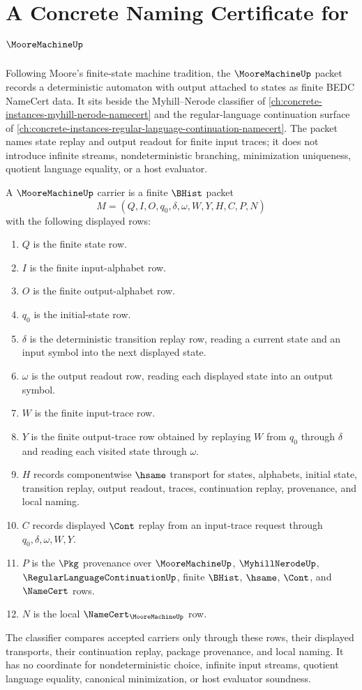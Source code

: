 \chapter{A Concrete Naming Certificate for $\MooreMachineUp$}
\label{ch:concrete-instances-moore-machine-namecert}

Following Moore's finite-state machine tradition, the $\MooreMachineUp$ packet records a deterministic automaton with output attached to states as finite BEDC NameCert data. It sits beside the Myhill--Nerode classifier of \autoref{ch:concrete-instances-myhill-nerode-namecert} and the regular-language continuation surface of \autoref{ch:concrete-instances-regular-language-continuation-namecert}. The packet names state replay and output readout for finite input traces; it does not introduce infinite streams, nondeterministic branching, minimization uniqueness, quotient language equality, or a host evaluator.

\begin{definition}
\label{def:moore-machine-carrier}
A $\MooreMachineUp$ carrier is a finite $\BHist$ packet
$$
M=(Q,I,O,q_0,\delta,\omega,W,Y,H,C,P,N)
$$
with the following displayed rows:
\begin{enumerate}
\item $Q$ is the finite state row.
\item $I$ is the finite input-alphabet row.
\item $O$ is the finite output-alphabet row.
\item $q_0$ is the initial-state row.
\item $\delta$ is the deterministic transition replay row, reading a current state and an input symbol into the next displayed state.
\item $\omega$ is the output readout row, reading each displayed state into an output symbol.
\item $W$ is the finite input-trace row.
\item $Y$ is the finite output-trace row obtained by replaying $W$ from $q_0$ through $\delta$ and reading each visited state through $\omega$.
\item $H$ records componentwise $\hsame$ transport for states, alphabets, initial state, transition replay, output readout, traces, continuation replay, provenance, and local naming.
\item $C$ records displayed $\Cont$ replay from an input-trace request through $q_0,\delta,\omega,W,Y$.
\item $P$ is the $\Pkg$ provenance over $\MooreMachineUp$, $\MyhillNerodeUp$, $\RegularLanguageContinuationUp$, finite $\BHist$, $\hsame$, $\Cont$, and $\NameCert$ rows.
\item $N$ is the local $\NameCert_{\MooreMachineUp}$ row.
\end{enumerate}
The classifier compares accepted carriers only through these rows, their displayed transports, their continuation replay, package provenance, and local naming. It has no coordinate for nondeterministic choice, infinite input streams, quotient language equality, canonical minimization, or host evaluator soundness.
\end{definition}

